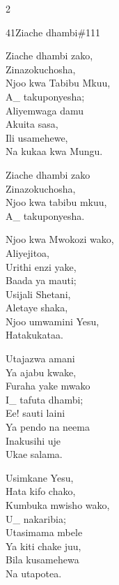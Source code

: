 \documentclass{article}
\begin{document}
\begin{multicols}{2}
\begin{hymn}{41}{Ziache dhambi}{\#111}
\begin{stanza}
Ziache dhambi zako,\\
Zinazokuchosha,\\
Njoo kwa Tabibu Mkuu,\\
A\_ takuponyesha;\\
Aliyemwaga damu\\
Akuita sasa,\\
Ili usamehewe,\\
Na kukaa kwa Mungu.
\end{stanza}
\begin{chorus}
Ziache dhambi zako\\
Zinazokuchosha,\\
Njoo kwa tabibu mkuu,\\
A\_ takuponyesha.
\end{chorus}
\begin{stanza}
Njoo kwa Mwokozi wako,\\
Aliyejitoa,\\
Urithi enzi yake,\\
Baada ya mauti;\\
Usijali Shetani,\\
Aletaye shaka,\\
Njoo umwamini Yesu,\\
Hatakukataa.
\end{stanza}
\begin{stanza}
Utajazwa amani\\
Ya ajabu kwake,\\
Furaha yake mwako\\
I\_ tafuta dhambi;\\
Ee! sauti laini\\
Ya pendo na neema\\
Inakusihi uje\\
Ukae salama.
\end{stanza}
\begin{stanza}
Usimkane Yesu,\\
Hata kifo chako,\\
Kumbuka mwisho wako,\\
U\_ nakaribia;\\
Utasimama mbele\\
Ya kiti chake juu,\\
Bila kusamehewa\\
Na utapotea.
\end{stanza}
\end{hymn}


\end{multicols}
\end{document}
